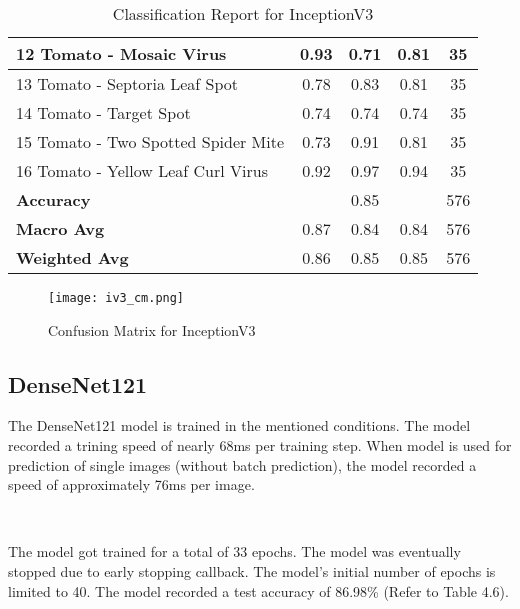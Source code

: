 \begin{table}[h!]
{\begin{tabular}{|l|c|c|c|c|}
    12 Tomato - Mosaic Virus                          & 0.93               & 0.71            & 0.81              & 35               \\ \hline
    13 Tomato - Septoria Leaf Spot                    & 0.78               & 0.83            & 0.81              & 35               \\ \hline
    14 Tomato - Target Spot                           & 0.74               & 0.74            & 0.74              & 35               \\ \hline
    15 Tomato - Two Spotted Spider Mite               & 0.73               & 0.91            & 0.81              & 35               \\ \hline
    16 Tomato - Yellow Leaf Curl Virus                & 0.92               & 0.97            & 0.94              & 35               \\ \hline
    \textbf{Accuracy}                                 & \multicolumn{3}{c|}{0.85}            & 576              \\ \hline
    \textbf{Macro Avg}                                & 0.87               & 0.84            & 0.84              & 576              \\ \hline
    \textbf{Weighted Avg}                             & 0.86               & 0.85            & 0.85              & 576              \\ \hline
    \end{tabular}%
    }
    \caption{Classification Report for InceptionV3}
    \label{tab:classification_report_inv3}
\end{table}

\begin{figure}[h!]
    \centering
    \texttt{[image: iv3\_cm.png]}
    \caption{Confusion Matrix for InceptionV3}
    \label{fig:iv3_cm}
\end{figure}

\subsection{DenseNet121}

The DenseNet121 model is trained in the mentioned conditions. The model recorded a trining speed of nearly 68ms per training step. When model is used for prediction of single images (without batch prediction), the model recorded a speed of approximately 76ms per image. 

\

The model got trained for a total of 33 epochs. The model was eventually stopped due to early stopping callback. The model's initial number of epochs is limited to 40. The model recorded a test accuracy of 86.98\% (Refer to Table 4.6).


